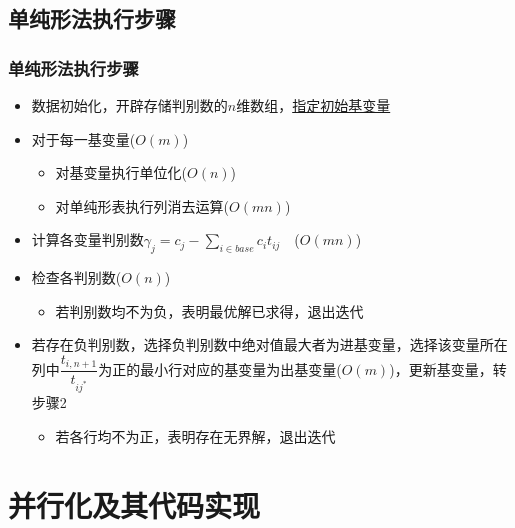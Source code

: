 \documentclass{beamer}
\begin{document}
\subsection{单纯形法执行步骤}
\begin{frame}
    \frametitle{单纯形法执行步骤}
    \begin{itemize}
        \item 数据初始化，开辟存储判别数的$n$维数组，\underline{指定初始基变量}
        \item 对于每一基变量($O(m)$)
              \begin{itemize}
                  \item 对基变量执行单位化($O(n)$)
                  \item 对单纯形表执行列消去运算($O(mn)$)
              \end{itemize}
        \item 计算各变量判别数$\gamma_j=c_j-\sum_{i\in base}c_it_{ij}\quad$($O(mn)$)
        \item 检查各判别数($O(n)$)
              \begin{itemize}
                  \item 若判别数均不为负，表明最优解已求得，退出迭代
              \end{itemize}
        \item 若存在负判别数，选择负判别数中绝对值最大者为进基变量，选择该变量所在列中$\dfrac{t_{i,n+1}}{t_{ij^*}}$为正的最小行对应的基变量为出基变量($O(m)$)，更新基变量，转步骤2
              \begin{itemize}
                  \item 若各行均不为正，表明存在无界解，退出迭代
              \end{itemize}
    \end{itemize}
\end{frame}

\section{并行化及其代码实现}
\end{document}

